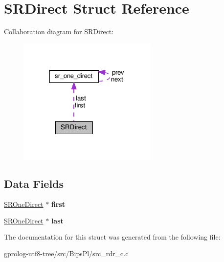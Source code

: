 \hypertarget{structSRDirect}{}\section{S\+R\+Direct Struct Reference}
\label{structSRDirect}


Collaboration diagram for S\+R\+Direct\+:\nopagebreak
\begin{figure}[H]
\begin{center}
\leavevmode
\includegraphics[width=195pt]{structSRDirect__coll__graph}
\end{center}
\end{figure}
\subsection*{Data Fields}
\begin{DoxyCompactItemize}
\item 
\hyperlink{structsr__one__direct}{S\+R\+One\+Direct} $\ast$ {\bfseries first}\hypertarget{structSRDirect_a418d898d49d9bfd256935f4e28bbf11b}{}\label{structSRDirect_a418d898d49d9bfd256935f4e28bbf11b}

\item 
\hyperlink{structsr__one__direct}{S\+R\+One\+Direct} $\ast$ {\bfseries last}\hypertarget{structSRDirect_aadd740950d79ebfff5baee79c33ced18}{}\label{structSRDirect_aadd740950d79ebfff5baee79c33ced18}

\end{DoxyCompactItemize}


The documentation for this struct was generated from the following file\+:\begin{DoxyCompactItemize}
\item 
gprolog-\/utf8-\/tree/src/\+Bips\+Pl/src\+\_\+rdr\+\_\+c.\+c\end{DoxyCompactItemize}
